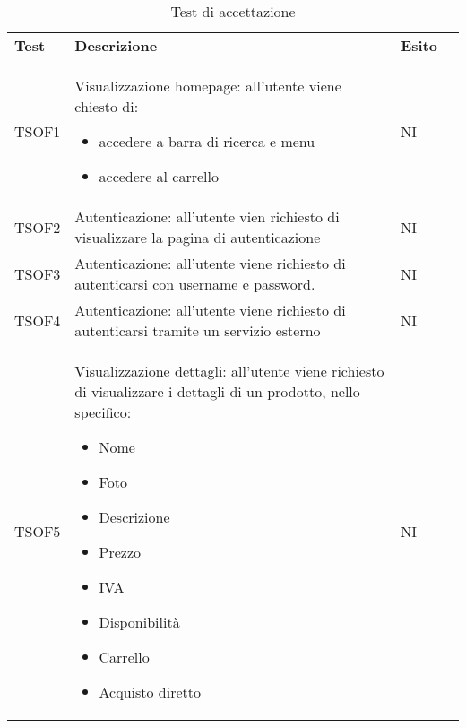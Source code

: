 \begin{center}
    \centering
    \renewcommand{\arraystretch}{1.8}
    \label{tab:TestAccettazione}
    \begin{longtable}[!h]{p{50px} p{245px} p{75px} p{50px}}
        \caption{Test di accettazione}                                                                                                                                                                       \\
        \rowcolor{logo!70} \textbf{Test} & \textbf{Descrizione}                                                                                                                             & \textbf{Esito} \\
        TSOF1                            & Visualizzazione homepage: all'utente viene chiesto di: \begin{itemize} \item accedere a barra di ricerca e menu \item accedere al carrello \end{itemize}                                                                 & NI             \\
        TSOF2                            & Autenticazione: all'utente vien richiesto di visualizzare la pagina di autenticazione                                                            & NI             \\
        TSOF3                            & Autenticazione: all'utente viene richiesto di autenticarsi con username e password.                                                              & NI             \\
        TSOF4                            & Autenticazione: all'utente viene richiesto di autenticarsi tramite un servizio esterno                                                           & NI             \\
        TSOF5                            & Visualizzazione dettagli: all'utente viene richiesto di visualizzare i dettagli di un prodotto, nello specifico: \begin{itemize} \item Nome \item Foto \item Descrizione \item Prezzo\item IVA \item Disponibilit\`a \item Carrello \item Acquisto diretto \end{itemize}       & NI             \\

\end{longtable}
\end{center}

